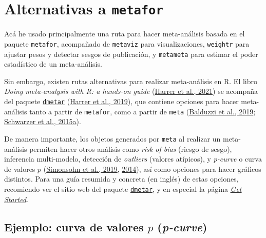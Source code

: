\documentclass[
  bookmarksnumbered]{article}
\begin{document}
\hypertarget{appendix-appendix}{%
\appendix}


\setcounter{table}{0} \renewcommand{\thetable}{A\arabic{table}} \setcounter{figure}{0} \renewcommand{\thefigure}{A\arabic{figure}}

\hypertarget{apendice-alt}{%
\section{\texorpdfstring{Alternativas a \texttt{metafor}}{Alternativas a metafor}}\label{apendice-alt}}

Acá he usado principalmente una ruta para hacer meta-análisis basada en el paquete \texttt{metafor}, acompañado de \texttt{metaviz} para visualizaciones, \texttt{weightr} para ajustar pesos y detectar sesgos de publicación, y \texttt{metameta} para estimar el poder estadístico de un meta-análisis.

Sin embargo, existen rutas alternativas para realizar meta-análisis en R. El libro \emph{Doing meta-analysis with R: a hands-on guide} (\protect\hyperlink{ref-harrer2021doing}{Harrer et al., 2021}) se acompaña del paquete \href{https://dmetar.protectlab.org/index.html}{\texttt{dmetar}} (\protect\hyperlink{ref-Harrer2019dmetar}{Harrer et al., 2019}), que contiene opciones para hacer meta-análisis tanto a partir de \texttt{metafor}, como a partir de \texttt{meta} (\protect\hyperlink{ref-BalduzziMeta2019}{Balduzzi et al., 2019}; \protect\hyperlink{ref-schwarzerMetaAnalysis2015}{Schwarzer et al., 2015a}).

De manera importante, los objetos generados por \texttt{meta} al realizar un meta-análisis permiten hacer otros análisis como \emph{risk of bias} (riesgo de sesgo), inferencia multi-modelo, detección de \emph{outliers} (valores atípicos), y \emph{p-curve} o curva de valores \(p\) (\protect\hyperlink{ref-simonsohnPcurveWonYour2019}{Simonsohn et al., 2019}, \protect\hyperlink{ref-simonsohnPCurveEffectSize2014}{2014}), así como opciones para hacer gráficos distintos. Para una guía resumida y concreta (en inglés) de estas opciones, recomiendo ver el sitio web del paquete \href{http://dmetar.protectlab.org/}{\texttt{dmetar}}, y en especial la página \href{https://dmetar.protectlab.org/articles/dmetar.html}{\emph{Get Started}}.

\hypertarget{p-curve}{%
\subsection{\texorpdfstring{Ejemplo: curva de valores \(p\) (\emph{p-curve})}{Ejemplo: curva de valores p (p-curve)}}\label{p-curve}}
\end{document}
